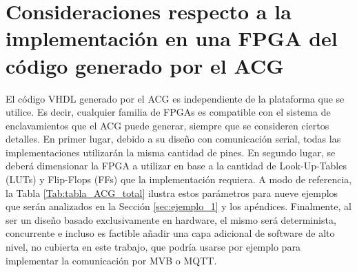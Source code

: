 \section{Consideraciones respecto a la implementación en una FPGA del código generado por el ACG}
	\label{sec:plataforma}
		
	
	El código VHDL generado por el ACG es independiente de la plataforma que se utilice. Es decir, cualquier familia de FPGAs es compatible con el sistema de enclavamientos que el ACG puede generar, siempre que se consideren ciertos detalles. En primer lugar, debido a su diseño con comunicación serial, todas las implementaciones utilizarán la misma cantidad de pines. En segundo lugar, se deberá dimensionar la FPGA a utilizar en base a la cantidad de Look-Up-Tables (LUTs) y Flip-Flops (FFs) que la implementación requiera. A modo de referencia, la Tabla \ref{Tab:tabla_ACG_total} ilustra estos parámetros para nueve ejemplos que serán analizados en la Sección \ref{sec:ejemplo_1} y los apéndices. Finalmente, al ser un diseño basado exclusivamente en hardware, el mismo será determinista, concurrente e incluso es factible añadir una capa adicional de software de alto nivel, no cubierta en este trabajo, que podría usarse por ejemplo para implementar la comunicación por MVB o MQTT.